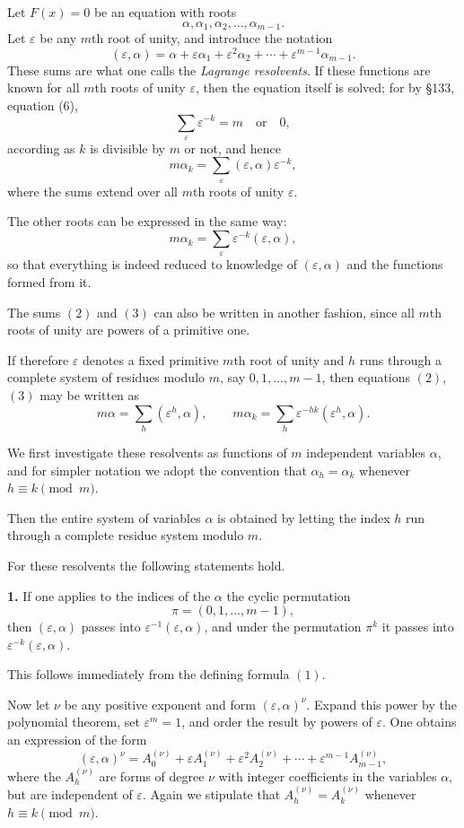 \documentclass[11pt,a4paper]{book}
\begin{document}
Let $F(x)=0$ be an equation with roots
\[
\alpha,\alpha_1,\alpha_2,\dots,\alpha_{m-1}.
\]
Let $\varepsilon$ be any $m$th root of unity, and introduce the notation
\[
(\varepsilon,\alpha)=\alpha+\varepsilon\alpha_1+\varepsilon^2\alpha_2+\cdots+\varepsilon^{m-1}\alpha_{m-1}.
\tag{1}
\]
These sums are what one calls the \emph{Lagrange resolvents}. If these functions are known for all $m$th roots of unity $\varepsilon$, then the equation itself is solved; for by \S 133, equation (6),
\[
\sum_{\varepsilon}\varepsilon^{-k}=m \quad\text{or}\quad 0,
\tag{2}
\]
according as $k$ is divisible by $m$ or not, and hence
\[
m\alpha_k=\sum_{\varepsilon}(\varepsilon,\alpha)\varepsilon^{-k},
\tag{3}
\]
where the sums extend over all $m$th roots of unity $\varepsilon$.

The other roots can be expressed in the same way:
\[
m\alpha_k=\sum_{\varepsilon}\varepsilon^{-k}(\varepsilon,\alpha),
\tag{4}
\]
so that everything is indeed reduced to knowledge of $(\varepsilon,\alpha)$ and the functions formed from it.

The sums \((2)\) and \((3)\) can also be written in another fashion, since all $m$th roots of unity are powers of a primitive one.

If therefore $\varepsilon$ denotes a fixed primitive $m$th root of unity and $h$ runs through a complete system of residues modulo $m$, say $0,1,\dots,m-1$, then equations \((2)\), \((3)\) may be written as
\[
m\alpha=\sum_h (\varepsilon^h,\alpha),\qquad
m\alpha_k=\sum_h \varepsilon^{-hk}(\varepsilon^h,\alpha).
\tag{5}
\]

We first investigate these resolvents as functions of $m$ independent variables $\alpha$, and for simpler notation we adopt the convention that $\alpha_h=\alpha_k$ whenever $h\equiv k\pmod m$.

Then the entire system of variables $\alpha$ is obtained by letting the index $h$ run through a complete residue system modulo $m$.

For these resolvents the following statements hold.

\medskip
\noindent\textbf{1.}
If one applies to the indices of the $\alpha$ the cyclic permutation
\[
\pi=(0,1,\dots,m-1),
\]
then $(\varepsilon,\alpha)$ passes into $\varepsilon^{-1}(\varepsilon,\alpha)$, and under the permutation $\pi^k$ it passes into $\varepsilon^{-k}(\varepsilon,\alpha)$.

\medskip
This follows immediately from the defining formula \((1)\).

Now let $\nu$ be any positive exponent and form $(\varepsilon,\alpha)^\nu$. Expand this power by the polynomial theorem, set $\varepsilon^m=1$, and order the result by powers of $\varepsilon$. One obtains an expression of the form
\[
(\varepsilon,\alpha)^\nu
=
A^{(\nu)}_0+\varepsilon A^{(\nu)}_1+\varepsilon^2A^{(\nu)}_2+\cdots+\varepsilon^{m-1}A^{(\nu)}_{m-1},
\tag{5'}
\]
where the $A^{(\nu)}_h$ are forms of degree $\nu$ with integer coefficients in the variables $\alpha$, but are independent of $\varepsilon$.
Again we stipulate that $A^{(\nu)}_h=A^{(\nu)}_k$ whenever $h\equiv k\pmod m$.
\end{document}
